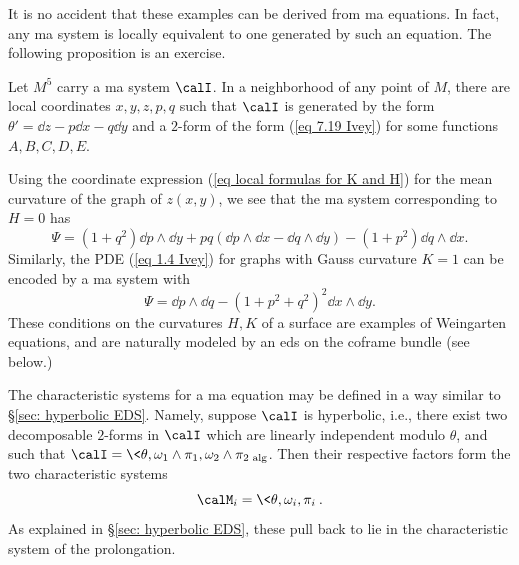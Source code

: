 It is no accident that these examples can be derived from \gls{ma} equations. In fact, any \gls{ma} system is locally equivalent to one generated by such an equation. The following proposition is an exercise.

\begin{prop}
    Let $M^5$ carry a \gls{ma} system $\calI$. In a neighborhood of any point of $M$, there are local coordinates $x,y,z,p,q$ such that $\calI$ is generated by the form $\theta'=\dd z-p\dd x-q\dd y$ and a $2$-form of the form (\ref{eq 7.19 Ivey}) for some functions $A,B,C,D,E$.
\end{prop}

\begin{example}\label{ex minimal surface EDS}
    Using the coordinate expression (\ref{eq local formulas for K and H}) for the mean curvature of the graph of $z(x,y)$, we see that the \gls{ma} system corresponding to $H=0$ has 
    \[\Psi=(1+q^2)\dd p\wedge \dd y+pq(\dd p\wedge \dd x-\dd q\wedge \dd y)-(1+p^2)\dd q\wedge \dd x.\]
    Similarly, the PDE (\ref{eq 1.4 Ivey}) for graphs with Gauss curvature $K=1$ can be encoded by a \gls{ma} system with 
    \[\Psi=\dd p\wedge \dd q-(1+p^2+q^2)^2\dd x\wedge \dd y.\]
    These conditions on the curvatures $H,K$ of a surface are examples of Weingarten equations, and are naturally modeled by an \gls{eds} on the coframe bundle (see below.)
\end{example}

The characteristic systems for a \gls{ma} equation may be defined in a way similar to \S\ref{sec: hyperbolic EDS}. Namely, suppose $\calI$ is hyperbolic, i.e., there exist two decomposable $2$-forms in $\calI$ which are linearly independent modulo $\theta$, and such that $\calI=\<\theta,\omega_1\wedge\pi_1,\omega_2\wedge\pi_2\>_{\mathrm{alg}}$. Then their respective factors form the two characteristic systems 
\[\calM_i=\<\theta,\omega_i,\pi_i\>.\]
As explained in  \S\ref{sec: hyperbolic EDS}, these pull back to lie in the characteristic system of the prolongation.

